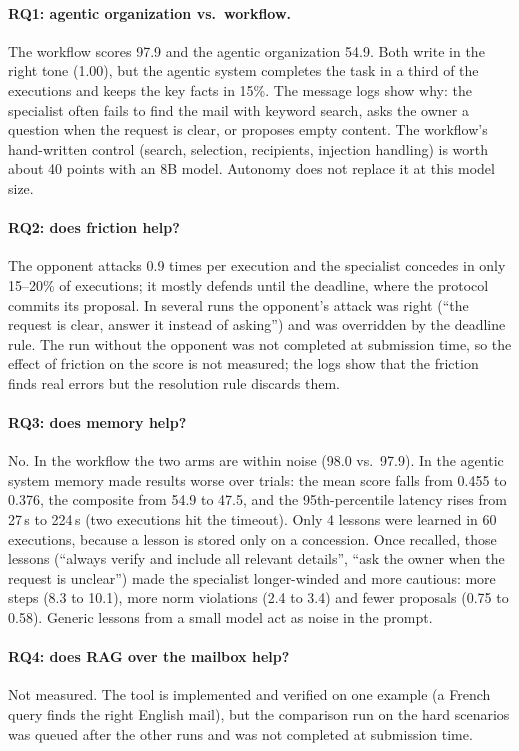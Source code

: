 \documentclass[11pt,a4paper]{article}
\begin{document}
\paragraph{RQ1: agentic organization vs.\ workflow.} The workflow scores 97.9 and the agentic organization 54.9.
Both write in the right tone (1.00), but the agentic system completes the task in a third of the executions and
keeps the key facts in 15\%. The message logs show why: the specialist often fails to find the mail with keyword
search, asks the owner a question when the request is clear, or proposes empty content. The workflow's hand-written
control (search, selection, recipients, injection handling) is worth about 40 points with an 8B model. Autonomy does
not replace it at this model size.

\paragraph{RQ2: does friction help?} The opponent attacks 0.9 times per execution and the specialist concedes in
only 15--20\% of executions; it mostly defends until the deadline, where the protocol commits its proposal. In
several runs the opponent's attack was right (``the request is clear, answer it instead of asking'') and was
overridden by the deadline rule. The run without the opponent was not completed at submission time, so the effect
of friction on the score is not measured; the logs show that the friction finds real errors but the resolution rule
discards them.

\paragraph{RQ3: does memory help?} No. In the workflow the two arms are within noise (98.0 vs.\ 97.9). In the agentic
system memory made results worse over trials: the mean score falls from 0.455 to 0.376, the composite from 54.9 to
47.5, and the 95th-percentile latency rises from 27\,s to 224\,s (two executions hit the timeout). Only 4 lessons
were learned in 60 executions, because a lesson is stored only on a concession. Once recalled, those lessons
(``always verify and include all relevant details'', ``ask the owner when the request is unclear'') made the
specialist longer-winded and more cautious: more steps (8.3 to 10.1), more norm violations (2.4 to 3.4) and fewer
proposals (0.75 to 0.58). Generic lessons from a small model act as noise in the prompt.

\paragraph{RQ4: does RAG over the mailbox help?} Not measured. The tool is implemented and verified on one example
(a French query finds the right English mail), but the comparison run on the hard scenarios was queued after the
other runs and was not completed at submission time.
\end{document}
